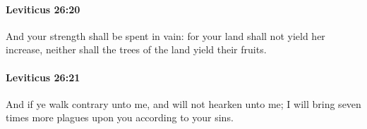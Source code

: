 		\paragraph{Leviticus 26:20} %
			\label{LEVITICUS-26-20}

			And your strength shall be spent in vain: for your land shall not yield her increase, neither shall the trees of the land yield their fruits.


		\paragraph{Leviticus 26:21} %
			\label{LEVITICUS-26-21}

			And if ye walk contrary unto me, and will not hearken unto me; I will bring seven times more plagues upon you according to your sins.


